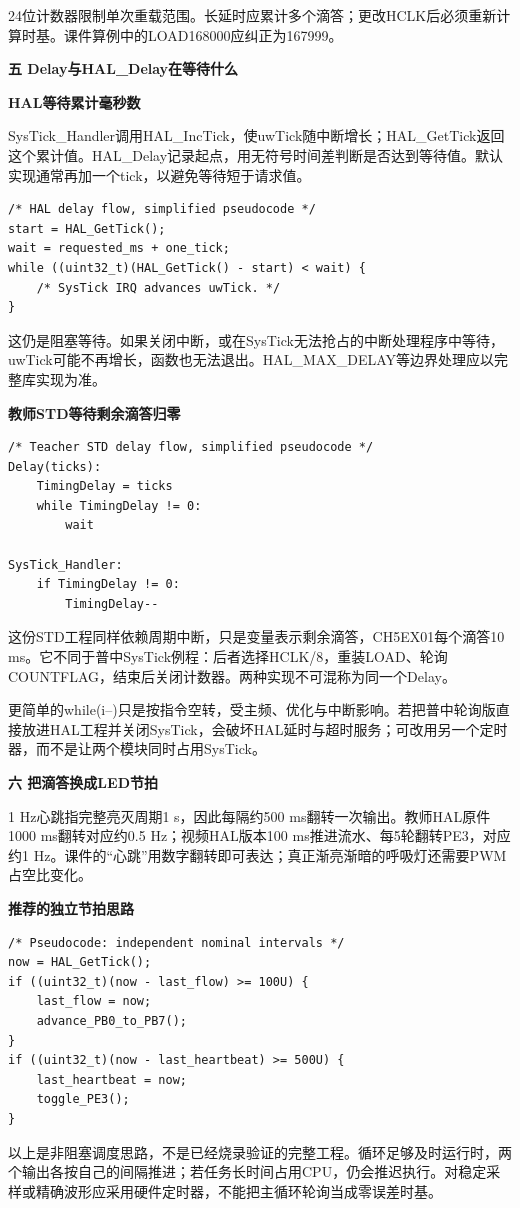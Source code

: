 \documentclass[10pt,a4paper]{article}
\newcommand{\qtitle}[1]{{\Large\bfseries #1}\par\vspace{4pt}}
\newcommand{\qsub}[1]{{\bfseries #1}\par}
\begin{document}
24位计数器限制单次重载范围。长延时应累计多个滴答；更改HCLK后必须重新计算时基。课件算例中的LOAD168000应纠正为167999。


\clearpage
{}
\qtitle{五 Delay与HAL\_\allowbreak{}Delay在等待什么}
\qsub{HAL等待累计毫秒数}
SysTick\_\allowbreak{}Handler调用HAL\_\allowbreak{}IncTick，使uwTick随中断增长；HAL\_\allowbreak{}GetTick返回这个累计值。HAL\_\allowbreak{}Delay记录起点，用无符号时间差判断是否达到等待值。默认实现通常再加一个tick，以避免等待短于请求值。

\begin{Verbatim}[fontsize=\scriptsize,breaklines=true]
/* HAL delay flow, simplified pseudocode */
start = HAL_GetTick();
wait = requested_ms + one_tick;
while ((uint32_t)(HAL_GetTick() - start) < wait) {
    /* SysTick IRQ advances uwTick. */
}
\end{Verbatim}
这仍是阻塞等待。如果关闭中断，或在SysTick无法抢占的中断处理程序中等待，uwTick可能不再增长，函数也无法退出。HAL\_\allowbreak{}MAX\_\allowbreak{}DELAY等边界处理应以完整库实现为准。

\qsub{教师STD等待剩余滴答归零}
\begin{Verbatim}[fontsize=\scriptsize,breaklines=true]
/* Teacher STD delay flow, simplified pseudocode */
Delay(ticks):
    TimingDelay = ticks
    while TimingDelay != 0:
        wait

SysTick_Handler:
    if TimingDelay != 0:
        TimingDelay--
\end{Verbatim}
这份STD工程同样依赖周期中断，只是变量表示剩余滴答，CH5EX01每个滴答10 ms。它不同于普中SysTick例程：后者选择HCLK/\allowbreak{}8，重装LOAD、轮询COUNTFLAG，结束后关闭计数器。两种实现不可混称为同一个Delay。

更简单的while(i--)只是按指令空转，受主频、优化与中断影响。若把普中轮询版直接放进HAL工程并关闭SysTick，会破坏HAL延时与超时服务；可改用另一个定时器，而不是让两个模块同时占用SysTick。


\clearpage
{}
\qtitle{六 把滴答换成LED节拍}
1 Hz心跳指完整亮灭周期1 s，因此每隔约500 ms翻转一次输出。教师HAL原件1000 ms翻转对应约0.5 Hz；视频HAL版本100 ms推进流水、每5轮翻转PE3，对应约1 Hz。课件的“心跳”用数字翻转即可表达；真正渐亮渐暗的呼吸灯还需要PWM占空比变化。

\qsub{推荐的独立节拍思路}
\begin{Verbatim}[fontsize=\scriptsize,breaklines=true]
/* Pseudocode: independent nominal intervals */
now = HAL_GetTick();
if ((uint32_t)(now - last_flow) >= 100U) {
    last_flow = now;
    advance_PB0_to_PB7();
}
if ((uint32_t)(now - last_heartbeat) >= 500U) {
    last_heartbeat = now;
    toggle_PE3();
}
\end{Verbatim}
以上是非阻塞调度思路，不是已经烧录验证的完整工程。循环足够及时运行时，两个输出各按自己的间隔推进；若任务长时间占用CPU，仍会推迟执行。对稳定采样或精确波形应采用硬件定时器，不能把主循环轮询当成零误差时基。
\end{document}
